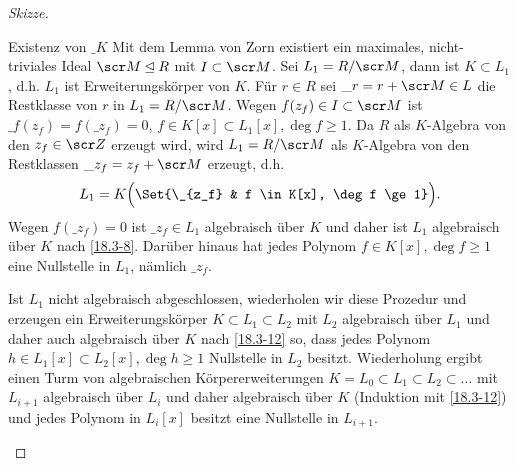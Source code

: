 \begin{st}
\begin{proof}[Skizze]
\begin{seg}{Existenz von $\_K$}
			Mit dem Lemma von Zorn existiert ein maximales, nicht-triviales Ideal $\scr M \IdealOf R$ mit $I \subset \scr M$.
			Sei $L_1 = R / \scr M$, dann ist $K \subset L_1$, d.h. $L_1$ ist Erweiterungskörper von $K$.
			Für $r \in R$ sei $\_r = r + \scr M \in L$ die Restklasse von $r$ in $L_1 = R / \scr M$.
			Wegen $f(z_f) \in I \subset \scr M$ ist $\_{f(z_f)} = f(\_{z_f}) = 0$, $f \in K[x] \subset L_1[x], \deg f \ge 1$.
			Da $R$ als $K$-Algebra von den $z_f \in \scr Z$ erzeugt wird, wird $L_1 = R / \scr M$ als $K$-Algebra von den Restklassen $\_{z_f} = z_f + \scr M$ erzeugt, d.h.
			\[
				L_1 = K\Big(\Set{\_{z_f} & f \in K[x], \deg f \ge 1}\Big).
			\]
			Wegen $f(\_{z_f}) = 0$ ist $\_{z_f} \in L_1$ algebraisch über $K$ und daher ist $L_1$ algebraisch über $K$ nach \ref{18.3-8}.
			Darüber hinaus hat jedes Polynom $f \in K[x], \deg f \ge 1$ eine Nullstelle in $L_1$, nämlich $\_{z_f}$.

			Ist $L_1$ nicht algebraisch abgeschlossen, wiederholen wir diese Prozedur und erzeugen ein Erweiterungskörper $K \subset L_1 \subset L_2$ mit $L_2$ algebraisch über $L_1$ und daher auch algebraisch über $K$ nach \ref{18.3-12} so, dass jedes Polynom $h \in L_1[x] \subset L_2[x], \deg h \ge 1$ Nullstelle in $L_2$ besitzt.
			Wiederholung ergibt einen Turm von algebraischen Körpererweiterungen $K = L_0 \subset L_1 \subset L_2 \subset \dotsc$ mit $L_{i+1}$ algebraisch über $L_i$ und daher algebraisch über $K$ (Induktion mit \ref{18.3-12}) und jedes Polynom in $L_i[x]$ besitzt eine Nullstelle in $L_{i+1}$.


\end{seg}
\end{proof}
\end{st}
